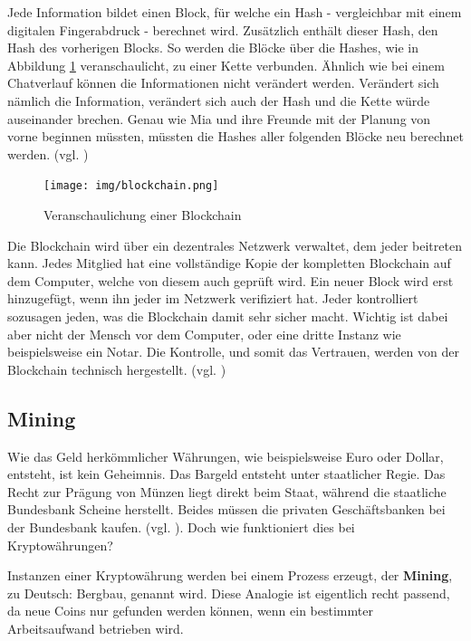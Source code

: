 \documentclass[oneside]{ausarbeitung}
\begin{document}
Jede Information bildet einen Block, für welche ein Hash -
vergleichbar mit einem digitalen Fingerabdruck - berechnet wird.
Zusätzlich enthält dieser Hash, den Hash des vorherigen Blocks. So
werden die Blöcke über die Hashes, wie in Abbildung \ref{fig:4}
veranschaulicht, zu einer Kette verbunden. Ähnlich wie bei einem
Chatverlauf können die Informationen nicht verändert werden.
Verändert sich nämlich die Information, verändert sich auch der
Hash und die Kette würde auseinander brechen. Genau wie Mia und ihre
Freunde mit der Planung von vorne beginnen müssten, müssten die
Hashes aller folgenden Blöcke neu berechnet werden. (vgl.
\cite{blockchain})

\begin{figure}[H]
  \centering
  \texttt{[image: img/blockchain.png]}
  \caption{Veranschaulichung einer Blockchain\cite{blockchain}}
  \label{fig:4}
\end{figure} 

Die Blockchain wird über ein dezentrales Netzwerk verwaltet, dem
jeder beitreten kann. Jedes Mitglied hat eine vollständige Kopie der
kompletten Blockchain auf dem Computer, welche von diesem auch
geprüft wird. Ein neuer Block wird erst hinzugefügt, wenn ihn jeder
im Netzwerk verifiziert hat. Jeder kontrolliert sozusagen jeden, was
die Blockchain damit sehr sicher macht. Wichtig ist dabei aber nicht
der Mensch vor dem Computer, oder eine dritte Instanz wie
beispielsweise ein Notar. Die Kontrolle, und somit das Vertrauen,
werden von der Blockchain technisch hergestellt. (vgl.
\cite{blockchain})

\subsection{Mining}
\label{sub:mining}

Wie das Geld herkömmlicher Währungen, wie beispielsweise Euro oder
Dollar, entsteht, ist kein Geheimnis. Das Bargeld entsteht unter
staatlicher Regie. Das Recht zur Prägung von Münzen liegt direkt
beim Staat, während die staatliche Bundesbank Scheine herstellt.
Beides müssen die privaten Geschäftsbanken bei der Bundesbank
kaufen. (vgl. \cite{herstellung_fiat_waehrung}). Doch wie funktioniert
dies bei Kryptowährungen?  

Instanzen einer Kryptowährung werden bei einem Prozess erzeugt, der
\textbf{Mining}, zu Deutsch: Bergbau, genannt wird. Diese Analogie ist
eigentlich recht passend, da neue Coins nur gefunden werden können,
wenn ein bestimmter Arbeitsaufwand betrieben wird.
\end{document}
